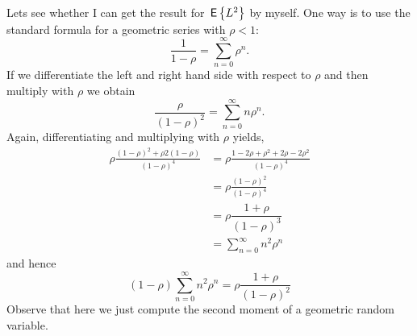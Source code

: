 \begin{question}
\begin{solution}
Lets see whether I can get the result for $\,\mathsf{E}\left\{L^2\right\}$ by myself.  One way
is to use the standard formula for a geometric series with $\rho < 1$:
\begin{equation*}
\dfrac{1}{1-\rho} = \sum_{n=0}^{\infty}\rho^n.
\end{equation*}
If we differentiate the left and right hand side with respect to
$\rho$  and then  multiply with $\rho$ we obtain
\begin{equation*}
\dfrac{\rho}{(1-\rho)^2}=\sum_{n=0}^{\infty}n\rho^n.
\end{equation*}
Again, differentiating and multiplying with $\rho$ yields, 
\begin{equation*}
  \begin{split}
\rho \frac{(1-\rho)^2 + \rho2(1-\rho)}{(1-\rho)^4} 
&= \rho \frac{1-2\rho+\rho^2 + 2\rho-2\rho^2}{(1-\rho)^4} \\
&= \rho \frac{(1-\rho)^2}{(1-\rho)^4} \\
&=\rho \dfrac{1+\rho}{(1-\rho)^3}\\
&=\sum_{n=0}^{\infty}n^2\rho^n
  \end{split}
\end{equation*}
and hence
\begin{equation*}
(1-\rho)\sum_{n=0}^{\infty}n^2\rho^n = \rho\dfrac{1+\rho}{(1-\rho)^2}
\end{equation*}
Observe that here we just compute the second moment of a geometric
random variable.



\end{solution}
\end{question}

